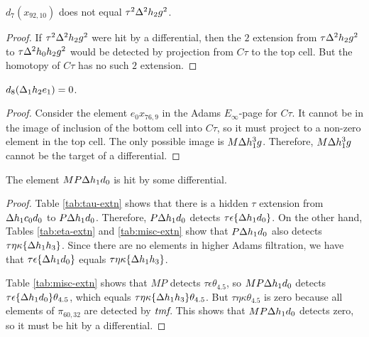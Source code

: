 \begin{lemma}
\label{lem:d7-x92,10}
$d_7(x_{92,10})$ does not equal $\tau^2 \Delta^2 h_2 g^2$.
\end{lemma}

\begin{proof}
If $\tau^2 \Delta^2 h_2 g^2$ were hit by a differential, then
the $2$ extension from $\tau \Delta^2 h_2 g^2$ to $\tau \Delta^2 h_0 h_2 g^2$
would be detected by projection from $C\tau$ to the top cell.
But the homotopy of $C\tau$ has no such $2$ extension.
\end{proof}

\begin{lemma}
\label{lem:d8-D1h2e1}
$d_8(\Delta_1 h_2 e_1) = 0$.
\end{lemma}

\begin{proof}
Consider the element $e_0 x_{76,9}$ in the
Adams $E_\infty$-page for $C\tau$.
It cannot be in the image of inclusion of the bottom cell
into $C\tau$, so it must project to a non-zero element in the
top cell.  The only possible image is $M \Delta h_1^3 g$.
Therefore, $M \Delta h_1^3 g$ cannot be the target of a differential.
\end{proof}

\begin{lemma}
\label{lem:hit-MPDh1d0}
The element $M P \Delta h_1 d_0$ is hit by some differential.
\end{lemma}

\begin{proof}
Table \ref{tab:tau-extn} shows that
there is a hidden $\tau$ extension from
$\Delta h_1 c_0 d_0$ to $P \Delta h_1 d_0$.  Therefore,
$P \Delta h_1 d_0$ detects $\tau \epsilon \{\Delta h_1 d_0\}$.
On the other hand, Tables \ref{tab:eta-extn} and
\ref{tab:misc-extn} show that
$P \Delta h_1 d_0$ also detects $\tau \eta \kappa \{\Delta h_1 h_3\}$.
Since there are no elements in higher Adams filtration, we 
have that $\tau \epsilon \{\Delta h_1 d_0\}$ equals
$\tau \eta \kappa \{\Delta h_1 h_3\}$.

Table \ref{tab:misc-extn} shows that
$M P$ detects $\tau \epsilon \theta_{4.5}$,
so $M P \Delta h_1 d_0$ detects 
$\tau \epsilon \{\Delta h_1 d_0\} \theta_{4.5}$, 
which equals 
$\tau \eta \kappa \{\Delta h_1 h_3\} \theta_{4.5}$.
But $\tau \eta \kappa \theta_{4.5}$ is zero because
all elements of $\pi_{60,32}$ are detected by $\textit{tmf}$.
This shows that $M P \Delta h_1 d_0$ detects zero, so it
must be hit by a differential.
\end{proof}

